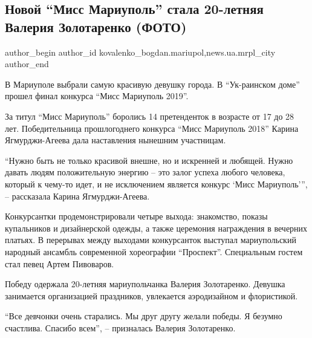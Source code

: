  
 
 
 
 
 
\subsection{Новой \enquote{Мисс Мариуполь} стала 20-летняя Валерия Золотаренко (ФОТО)}
\label{sec:04_11_2019.stz.news.ua.mrpl_city.1.miss_mrpl_valeria_zolotarenko}
 
\ifcmt
 author_begin
   author_id kovalenko_bogdan.mariupol,news.ua.mrpl_city
 author_end
\fi

В Мариуполе выбрали самую красивую девушку города. В \enquote{Ук\hyp{}раинском доме} прошел
финал конкурса \enquote{Мисс Мариуполь 2019}.

За титул \enquote{Мисс Мариуполь} боролись 14 претенденток в возрасте от 17 до 28 лет.
Победительница прошлогоднего конкурса \enquote{Мисс Мариуполь 2018} Карина
Ягмурджи-Агеева дала наставления нынешним участницам.

\enquote{Нужно быть не только красивой внешне, но и искренней и любящей. Нужно
давать людям положительную энергию – это залог успеха любого человека, который
к чему-то идет, и не исключением является конкурс \enquote{Мисс Мариуполь}}, –
рассказала Карина Ягмурджи-Агеева.

Конкурсантки продемонстрировали четыре выхода: знакомство, показы купальников и
дизайнерской одежды, а также церемония награждения в вечерних платьях. В
перерывах между выходами конкурсанток выступал мариупольский народный ансамбль
современной хореографии \enquote{Проспект}. Специальным гостем стал певец Артем
Пивоваров.

Победу одержала 20-летняя мариупольчанка Валерия Золотаренко. Девушка
занимается организацией праздников, увлекается аэродизайном и флористикой.

\enquote{Все девчонки очень старались. Мы друг другу желали победы. Я безумно
счастлива. Спасибо всем}, – призналась Валерия Золотаренко.

